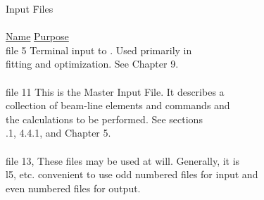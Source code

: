 \vspace{3 mm}
\begin{tabbing}
\noindent Input \= Files\hspace{1cm}\= \\
\vspace{2 mm} \\
\>\underline{Name}  \>  \underline{Purpose} \\
\>       file 5    \>    Terminal input to \Maryend.  Used primarily in  \\
\>                 \>    fitting and optimization.  See Chapter 9. \\
                      \\
\>       file 11   \>    This is the Master Input File.  It describes a  \\
\>                 \>    collection of beam-line elements and commands and \\
\>                 \>    the calculations to be performed.  See sections \\
\>                 .1, 4.4.1, and Chapter 5. \\
                    \\
\>       file 13,  \>    These files may be used at will.  Generally, it is \\
\>       l5, etc.  \>    convenient to use odd numbered files for input and \\
\>                 \>    even numbered files for output.


\end{tabbing}

